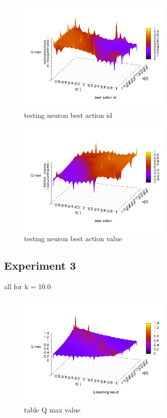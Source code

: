 \documentclass[10pt,a5paper]{article}
\begin{document}
\begin{figure}[!ht]
\centering
\includegraphics[width=2.9in]{q_learning_test/experiment_02/testing_neuron/q_action_id.png}
\caption{testing neuron best action id}
\label{testing neuron best action id}
\end{figure}

\begin{figure}[!ht]
\centering
\includegraphics[width=2.9in]{q_learning_test/experiment_02/testing_neuron/q_action.png}
\caption{testing neuron best action value}
\label{testing neuron best action value}
\end{figure}

\clearpage



\subsection{Experiment 3}

all for k = 10.0

\begin{figure}[!ht]
\centering
\includegraphics[width=2.9in]{q_learning_test/experiment_03/table/q_map.png}
\caption{table Q max value}
\label{table Q max value}
\end{figure}
\end{document}
